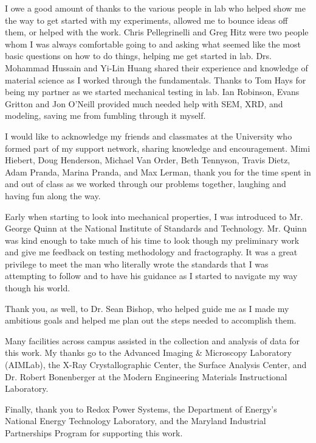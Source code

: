 I owe a good amount of thanks to the various people in lab who helped show me the way to get started with my experiments, allowed me to bounce ideas off them, or helped with the work.
Chris Pellegrinelli and Greg Hitz were two people whom I was always comfortable going to and asking what seemed like the most basic questions on how to do things, helping me get started in lab.
Drs. Mohammad Hussain and Yi-Lin Huang shared their experience and knowledge of material science as I worked through the fundamentals.
Thanks to Tom Hays for being my partner as we started mechanical testing in lab.
Ian Robinson, Evans Gritton and Jon O'Neill provided much needed help with SEM, XRD, and modeling, saving me from fumbling through it myself.

I would like to acknowledge my friends and classmates at the University who formed part of my support network, sharing knowledge and encouragement.
Mimi Hiebert, Doug Henderson, Michael Van Order, Beth Tennyson, Travis Dietz, Adam Pranda, Marina Pranda, and Max Lerman, thank you for the time spent in and out of class as we worked through our problems together, laughing and having fun along the way.

Early when starting to look into mechanical properties, I was introduced to Mr. George Quinn at the National Institute of Standards and Technology.
Mr. Quinn was kind enough to take much of his time to look though my preliminary work and give me feedback on testing methodology and fractography.
It was a great privilege to meet the man who literally wrote the standards that I was attempting to follow and to have his guidance as I started to navigate my way though his world.

Thank you, as well, to Dr. Sean Bishop, who helped guide me as I made my ambitious goals and helped me plan out the steps needed to accomplish them.

Many facilities across campus assisted in the collection and analysis of data for this work. My thanks go to the Advanced Imaging \& Microscopy Laboratory (AIMLab), the X-Ray Crystallographic Center, the Surface Analysis Center, and Dr. Robert Bonenberger at the Modern Engineering Materials Instructional Laboratory.

Finally, thank you to Redox Power Systems, the Department of Energy's National Energy Technology Laboratory, and the Maryland Industrial Partnerships Program for supporting this work.
